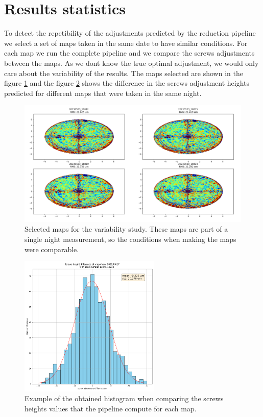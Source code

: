 \section{Results statistics}

To detect the repetibility of the adjustments predicted by the reduction pipeline we select a set of maps taken in the same date to have similar conditions.
For each map we run the complete pipeline and we compare the screws adjustments between the maps. As we dont know the true optimal adjustment, we would only care about the variability of the results.
The maps selected are shown in the figure \ref{fig:statistic_maps} and the figure \ref{fig:hist_example} shows the difference in the screws adjustment heights predicted for different maps that were taken in the same night.

\begin{figure}
    \centering
    \includegraphics[width=\textwidth]{images/20230523_maps.png}
    \caption{Selected maps for the variability study. These maps are part of a single night measurement, so the conditions when making the maps were comparable.}
    \label{fig:statistic_maps}
\end{figure}



\begin{figure}
    \centering
    \includegraphics[width=0.6\textwidth]{images/hist_example.png}
    \caption{Example of the obtained histogram when comparing the screws heights values that the pipeline compute for each map.}
    \label{fig:hist_example}
\end{figure}



